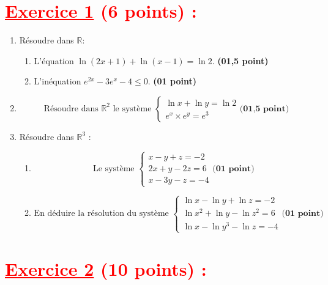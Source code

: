 \documentclass[12pt]{article}
\begin{document}
\section*{\textcolor{red}{\underline{Exercice 1} (6 points) :}}
\begin{enumerate}
\item Résoudre dans $\mathbb{R}$:
	\begin{enumerate}
	\item L'équation $\ln(2x+1)+\ln(x-1)=\ln2$. \textbf{(01,5 point)}
	\item L'inéquation $e^{2x}-3e^{x}-4 \leq 0$. \textbf{(01 point)}
	\end{enumerate}
\item \[ \text{Résoudre dans } \mathbb{R}^{2} \text{ le système }
\begin{cases}
\ln x + \ln y = \ln 2\\
e^{x}\times e^{y}=e^{3}
\end{cases}  \textbf{(01,5 point)}\]
\item Résoudre dans $\mathbb{R}^{3}$ :
\begin{enumerate}
\item \[ \text{Le système }
\begin{cases}
x-y+z = -2\\
2x+y-2z = 6\\
x-3y-z=-4
\end{cases}  \textbf{(01 point)}\]
\item \[ \text{En déduire la résolution du système }
\begin{cases}
\ln x-\ln y+\ln z = -2\\
\ln x^{2}+\ln y-\ln z^{2} = 6\\
\ln x-\ln y^{3}-\ln z=-4
\end{cases}  \textbf{(01 point)}\]
\end{enumerate}
\end{enumerate}
\section*{\textcolor{red}{\underline{Exercice 2} (10 points) :}}
\end{document}
